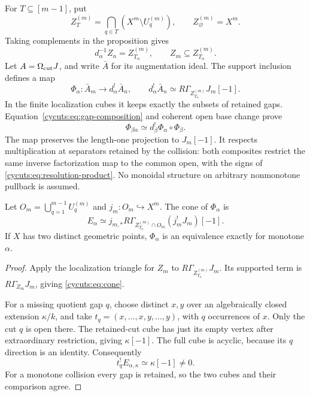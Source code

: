 For $T\subseteq[m-1]$, put
\[
 Z_T^{(m)}=\bigcap_{q\in T}(X^m\setminus U_q^{(m)}),
 \qquad Z_\varnothing^{(m)}=X^m.
\]
Taking complements in the proposition gives
\[
 d_\alpha^{-1}Z_n=Z_{T_\alpha}^{(m)},\qquad
 Z_m\subseteq Z_{T_\alpha}^{(m)}.
\]
Let $A=\Omega_{\mathrm{cut}} J$, and write $\bar A$ for its augmentation ideal.
The support inclusion defines a map
\begin{equation}\label{cycuts:eq:Phi}
 \Phi_\alpha:\bar A_m\longrightarrow d_\alpha^!\bar A_n,
 \qquad d_\alpha^!\bar A_n
       \simeq R\Gamma_{Z_{T_\alpha}^{(m)}}J_m[-1].
\end{equation}
In the finite localization cubes it keeps exactly the subsets of
retained gaps. Equation~\eqref{cycuts:eq:gap-composition} and coherent
open base change prove
\[
 \Phi_{\beta\alpha}\simeq d_\beta^!\Phi_\alpha\circ\Phi_\beta.
\]
The map preserves the length-one projection to $J_m[-1]$.
It respects multiplication at separators retained by the collision:
both composites restrict the same inverse factorization map to the
common open, with the signs of \eqref{cycuts:eq:resolution-product}.
No monoidal structure on arbitrary nonmonotone pullback is assumed.

\begin{theorem}\label{cycuts:thm:collision-cone}
Let $O_m=\bigcup_{q=1}^{m-1}U_q^{(m)}$ and $j_m:O_m\hookrightarrow X^m$.
The cone of $\Phi_\alpha$ is
\begin{equation}\label{cycuts:eq:cone}
 E_\alpha\simeq
 j_{m,*}R\Gamma_{Z_{T_\alpha}^{(m)}\cap O_m}(j_m^!J_m)[-1].
\end{equation}
If $X$ has two distinct geometric points, $\Phi_\alpha$ is an
equivalence exactly for monotone $\alpha$.
\end{theorem}
\begin{proof}
Apply the localization triangle for $Z_m$ to
$R\Gamma_{Z_{T_\alpha}^{(m)}}J_m$. Its supported term is
$R\Gamma_{Z_m}J_m$, giving \eqref{cycuts:eq:cone}.

For a missing quotient gap $q$, choose distinct $x,y$ over an
algebraically closed extension $\kappa/k$, and take
$t_q=(x,\ldots,x,y,\ldots,y)$, with $q$ occurrences of $x$.
Only the cut $q$ is open there. The retained-cut cube has just its
empty vertex after extraordinary restriction, giving $\kappa[-1]$.
The full cube is acyclic, because its $q$ direction is an identity.
Consequently
\[
 t_q^!E_{\alpha,\kappa}\simeq\kappa[-1]\ne0.
\]
For a monotone collision every gap is retained, so the two cubes
and their comparison agree.
\end{proof}


